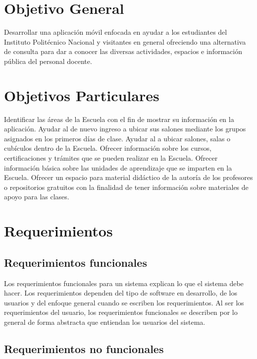 \section{Objetivo General}

	Desarrollar una aplicación móvil enfocada en ayudar a los estudiantes del Instituto Politécnico Nacional y visitantes en general ofreciendo una alternativa de consulta para dar a conocer las diversas actividades, espacios e información pública del personal docente.
	
	\section{Objetivos Particulares}	
	
	
	
	\begin{UClist}
		\UCli Identificar las áreas de la Escuela con el fin de mostrar su información en la aplicación.
		\UCli Ayudar al  de nuevo ingreso a ubicar sus salones mediante los grupos asignados en los primeros días de clase.
		\UCli Ayudar al  a ubicar salones, salas o cubículos dentro de la Escuela.
		\UCli Ofrecer información sobre los cursos, certificaciones y trámites que se pueden realizar en la Escuela.
		\UCli Ofrecer información básica sobre las unidades de aprendizaje que se imparten en la Escuela.
		\UCli Ofrecer un espacio para material didáctico de la autoría de los profesores o repositorios gratuitos con la finalidad de tener información sobre materiales de apoyo para las clases.
	\end{UClist}
	
	\section{Requerimientos}
	\subsection{Requerimientos funcionales}
	
	Los requerimientos funcionales para un sistema explican lo que el sistema debe hacer. Los requerimientos dependen del tipo de software en desarrollo, de los usuarios y del enfoque general cuando se escriben los requerimientos. Al ser los requerimientos del usuario, los requerimientos funcionales se describen por lo general de forma abstracta que entiendan los usuarios del sistema.
	
	
	\subsection{Requerimientos no funcionales}
	
	